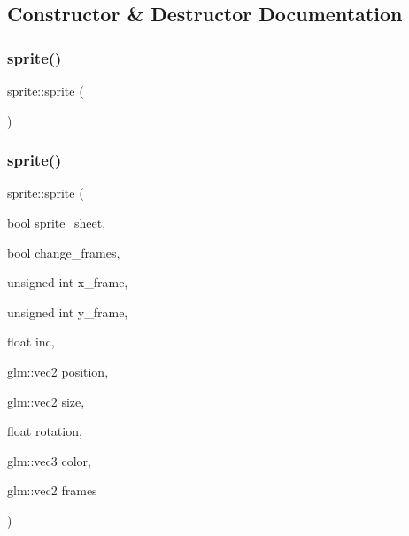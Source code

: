 \subsection{Constructor \& Destructor Documentation}
\mbox{\label{classsprite_ab301a52437b1fedba953a3a3003d3a0d}} 
\subsubsection{\texorpdfstring{sprite()}{sprite()}\hspace{0.1cm}{\footnotesize\ttfamily [1/2]}}
{\footnotesize\ttfamily sprite\+::sprite (\begin{DoxyParamCaption}{ }\end{DoxyParamCaption})\hspace{0.3cm}{\ttfamily [inline]}}

\mbox{\label{classsprite_a16fd4fd92c1244afa585c3b6ef3994ca}} 
\subsubsection{\texorpdfstring{sprite()}{sprite()}\hspace{0.1cm}{\footnotesize\ttfamily [2/2]}}
{\footnotesize\ttfamily sprite\+::sprite (\begin{DoxyParamCaption}\item[{bool}]{sprite\+\_\+sheet,  }\item[{bool}]{change\+\_\+frames,  }\item[{unsigned int}]{x\+\_\+frame,  }\item[{unsigned int}]{y\+\_\+frame,  }\item[{float}]{inc,  }\item[{glm\+::vec2}]{position,  }\item[{glm\+::vec2}]{size,  }\item[{float}]{rotation,  }\item[{glm\+::vec3}]{color,  }\item[{glm\+::vec2}]{frames }\end{DoxyParamCaption})}

\mbox{\label{classsprite_aa2c57852113368003657c673e39b6f3a}} 
